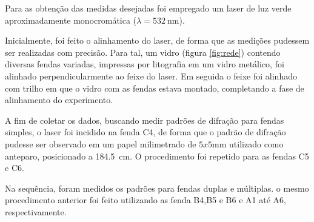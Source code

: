 Para as obtenção das medidas desejadas foi empregado um laser de luz verde aproximadamente monocromática ($\lambda = \SI{532}{\nano\meter}$). 

Inicialmente, foi feito o alinhamento do laser, de forma que as medições pudessem ser realizadas com precisão. Para tal, um vidro (figura \ref{fig:rede}) contendo diversas fendas variadas, impressas por litografia em um vidro metálico, foi alinhado perpendicularmente ao feixe do laser. Em seguida o feixe foi alinhado com trilho em que o vidro com as fendas estava montado, completando a fase de alinhamento do experimento. 



A fim de coletar os dados, buscando medir padrões de difração para fendas simples, o laser foi incidido na fenda C4, de forma que o padrão de difração pudesse ser observado em um papel milimetrado de $5x5\si{\milli\meter}$ utilizado como anteparo, posicionado a \SI{184,5}{\centi\meter}. O procedimento foi repetido para as fendas C5 e C6.

Na sequência, foram medidos os padrões para fendas duplas e múltiplas. o mesmo procedimento anterior foi feito utilizando as fenda B4,B5 e B6 e A1 até A6, respectivamente.
